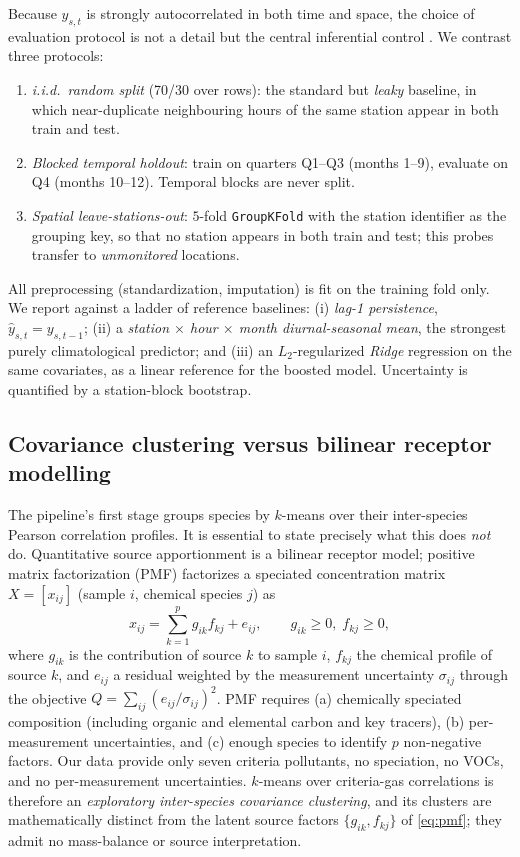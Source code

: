Because $y_{s,t}$ is strongly autocorrelated in both time and space, the choice of
evaluation protocol is not a detail but the central inferential control
\citep{kaufman2012leakage,roberts2017cv,varma2006cv}. We contrast three protocols:
\begin{enumerate}
  \item \emph{i.i.d.\ random split} (70/30 over rows): the standard but
  \emph{leaky} baseline, in which near-duplicate neighbouring hours of the same station
  appear in both train and test.
  \item \emph{Blocked temporal holdout}: train on quarters Q1--Q3 (months 1--9),
  evaluate on Q4 (months 10--12). Temporal blocks are never split.
  \item \emph{Spatial leave-stations-out}: $5$-fold \texttt{GroupKFold} with the station
  identifier as the grouping key, so that no station appears in both train and test;
  this probes transfer to \emph{unmonitored} locations.
\end{enumerate}
All preprocessing (standardization, imputation) is fit on the training fold only.
We report against a ladder of reference baselines: (i) \emph{lag-1 persistence},
$\hat y_{s,t}=y_{s,t-1}$; (ii) a \emph{station $\times$ hour $\times$ month
diurnal-seasonal mean}, the strongest purely climatological predictor; and (iii) an
$L_2$-regularized \emph{Ridge} regression \citep{hastie2009esl} on the same covariates,
as a linear reference for the boosted model. Uncertainty is quantified by a station-block bootstrap.

\subsection{Covariance clustering versus bilinear receptor modelling}
The pipeline's first stage groups species by $k$-means over their inter-species
Pearson correlation profiles. It is essential to state precisely what this does
\emph{not} do. Quantitative source apportionment is a bilinear receptor model; positive
matrix factorization (PMF) \citep{paatero1994pmf} factorizes a speciated
concentration matrix $X=[x_{ij}]$ (sample $i$, chemical species $j$) as
\begin{equation}
  x_{ij} = \sum_{k=1}^{p} g_{ik} f_{kj} + e_{ij},
  \qquad g_{ik}\ge 0,\; f_{kj}\ge 0,
  \label{eq:pmf}
\end{equation}
where $g_{ik}$ is the contribution of source $k$ to sample $i$, $f_{kj}$ the
chemical profile of source $k$, and $e_{ij}$ a residual weighted by the measurement
uncertainty $\sigma_{ij}$ through the objective
$Q=\sum_{ij}(e_{ij}/\sigma_{ij})^2$. PMF requires (a) chemically speciated composition
(including organic and elemental carbon and key tracers), (b) per-measurement
uncertainties, and (c) enough species to identify $p$ non-negative factors. Our data
provide only seven criteria pollutants, no speciation, no VOCs, and no per-measurement
uncertainties. $k$-means over criteria-gas correlations is therefore an
\emph{exploratory inter-species covariance clustering}, and its clusters are
mathematically distinct from the latent source factors $\{g_{ik},f_{kj}\}$ of
\eqref{eq:pmf}; they admit no mass-balance or source interpretation.

